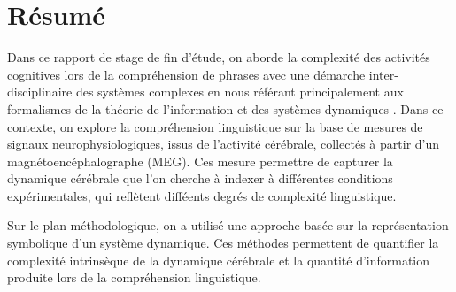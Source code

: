 \chapter*{Résumé}

Dans ce rapport de stage de fin d'étude, on aborde la complexité des activités cognitives lors de la compréhension de phrases avec une démarche inter-disciplinaire des systèmes complexes en nous référant principalement aux formalismes de la théorie de l'information et des systèmes dynamiques \cite{8}. Dans ce contexte, on explore la compréhension linguistique sur la base de mesures de signaux neurophysiologiques, issus de l'activité cérébrale, collectés à partir d'un magnétoencéphalographe (MEG). Ces mesure permettre de capturer la dynamique cérébrale que l'on cherche à indexer à différentes conditions expérimentales, qui reflètent difféents degrés de complexité linguistique.

Sur le plan méthodologique, on a utilisé une approche basée sur la représentation symbolique d'un système dynamique. Ces méthodes permettent de quantifier la complexité intrinsèque de la dynamique cérébrale et la quantité d'information produite lors de la compréhension linguistique.
